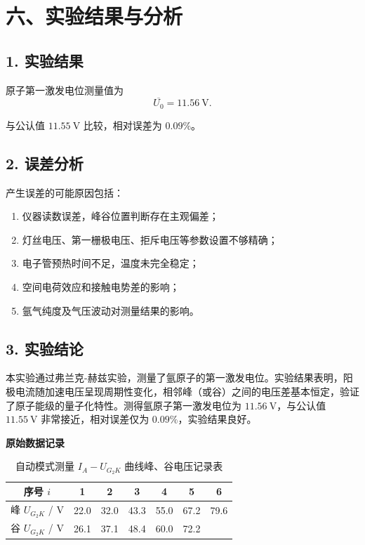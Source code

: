 \documentclass[UTF8,a4paper,zihao=-4]{ctexart}
\begin{document}
\section*{六、实验结果与分析}

\subsection*{1. 实验结果}

原子第一激发电位测量值为
\[
\boxed{\overline{U_0} = 11.56\ \text{V}}.
\]

与公认值 \(11.55\ \text{V}\) 比较，相对误差为 \(0.09\%\)。

\subsection*{2. 误差分析}

产生误差的可能原因包括：
\begin{enumerate}[label=\arabic*.]
    \item 仪器读数误差，峰谷位置判断存在主观偏差；
    \item 灯丝电压、第一栅极电压、拒斥电压等参数设置不够精确；
    \item 电子管预热时间不足，温度未完全稳定；
    \item 空间电荷效应和接触电势差的影响；
    \item 氩气纯度及气压波动对测量结果的影响。
\end{enumerate}

\subsection*{3. 实验结论}

本实验通过弗兰克-赫兹实验，测量了氩原子的第一激发电位。实验结果表明，阳极电流随加速电压呈现周期性变化，相邻峰（或谷）之间的电压差基本恒定，验证了原子能级的量子化特性。测得氩原子第一激发电位为 \(11.56\ \text{V}\)，与公认值 \(11.55\ \text{V}\) 非常接近，相对误差仅为 \(0.09\%\)，实验结果良好。

\newpage
\begin{center}
    {\bfseries 原始数据记录\par}
\end{center}

\vspace{0.5cm}

\begin{table}[H]
    \centering
    \caption{自动模式测量 \(I_A-U_{G_2K}\) 曲线峰、谷电压记录表}
    \renewcommand{\arraystretch}{1.35}
    \begin{tabular}{ccccccc}
        \toprule
        序号 \(i\) & 1 & 2 & 3 & 4 & 5 & 6 \\
        \midrule
        峰 \(U_{G_2K}\) / V & 22.0 & 32.0 & 43.3 & 55.0 & 67.2 & 79.6 \\
        谷 \(U_{G_2K}\) / V & 26.1 & 37.1 & 48.4 & 60.0 & 72.2 & \\
        \bottomrule
    \end{tabular}
\end{table}
\end{document}
